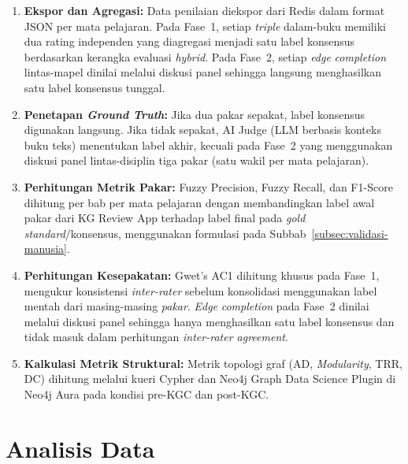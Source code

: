 \documentclass[../../thesis]{subfiles}
\begin{document}
\begin{enumerate}
  \item \textbf{Ekspor dan Agregasi:} Data penilaian diekspor dari Redis
        dalam format JSON per mata pelajaran. Pada Fase~1, setiap
        \textit{triple} dalam-buku memiliki dua rating independen yang
        diagregasi menjadi satu label konsensus berdasarkan kerangka
        evaluasi \textit{hybrid}. Pada Fase~2, setiap \textit{edge}
        \textit{completion} lintas-mapel dinilai melalui diskusi panel
        sehingga langsung menghasilkan satu label konsensus tunggal.

  \item \textbf{Penetapan \textit{Ground Truth}:} Jika dua
        pakar sepakat, label konsensus digunakan langsung.
        Jika tidak sepakat, AI Judge (LLM berbasis konteks buku teks)
        menentukan label akhir, kecuali pada Fase~2 yang
        menggunakan diskusi panel lintas-disiplin tiga pakar (satu wakil
        per mata pelajaran).

  \item \textbf{Perhitungan Metrik Pakar:} Fuzzy Precision, Fuzzy Recall, dan
        F1-Score dihitung per bab per mata pelajaran dengan membandingkan
        label awal pakar dari KG Review App terhadap label final
        pada \textit{gold standard}/konsensus, menggunakan formulasi pada
        Subbab~\ref{subsec:validasi-manusia}.

  \item \textbf{Perhitungan Kesepakatan:} Gwet's AC1 dihitung khusus pada
        Fase~1, mengukur konsistensi \textit{inter-rater} sebelum
        konsolidasi menggunakan label mentah dari masing-masing
        \textit{pakar}. \textit{Edge} \textit{completion} pada Fase~2
        dinilai melalui diskusi panel sehingga hanya menghasilkan satu
        label konsensus dan tidak masuk dalam perhitungan
        \textit{inter-rater agreement}.

  \item \textbf{Kalkulasi Metrik Struktural:} Metrik topologi graf
        (AD, \textit{Modularity}, TRR, DC) dihitung melalui kueri Cypher dan
        Neo4j Graph Data Science Plugin di Neo4j Aura pada kondisi pre-KGC dan
        post-KGC.
\end{enumerate}

\section{Analisis Data}
\end{document}
